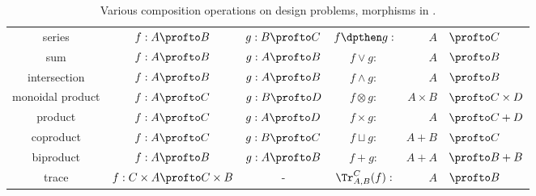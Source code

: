 \begin{table}[t!]
    \centering
    \begin{tabular}{c|c|c|crl}
        series                             &
        $f:A\profto B$                     &
        $g:B\profto C$                     &
        $f\dpthen g:$                        & $A$         & $\profto C$ \\
        sum                                &
        $f:A\profto B$                     &
        $g:A\profto B$                     &
        $f\vee g:$                         & $A$         & $\profto B$ \\
        intersection                       &
        $f:A\profto B$                     &
        $g:A\profto B$                     &
        $f\wedge g:$                       & $A$         & $\profto B$ \\
        monoidal product                   &
        $f:A\profto C$                     &
        $g:B\profto D$                     &
        $f\otimes g:$                      & $A\times B$ & $\profto C \times D$ \\
        product                            &
        $f:A\profto C$                     &
        $g:A\profto D$                     &
        $f\times g:$                       & $A $        & $\profto C + D$ \\
        coproduct                          &
        $f:A\profto C$                     &
        $g:B\profto C$                     &
        $f\sqcup g:$                       & $A + B $    & $\profto C$ \\
        biproduct                          &
        $f:A\profto B$                     &
        $g:A\profto B$                     &
        $f+ g:$                            & $A + A$     & $\profto B + B$ \\
        trace                              &
        $f: C \times A \profto C \times B$ &
        -                                  &
        $\Tr_{A,B}^C(f) :$                 & $A$         & $\profto B$
    \end{tabular}
    \caption{Various composition operations on design problems, morphisms in \DP.}
\end{table}
